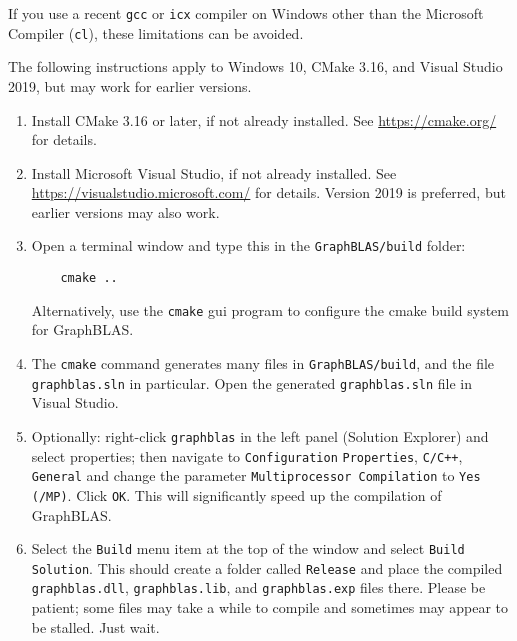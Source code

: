 \documentclass[12pt]{article}
\begin{document}
If you use a recent \verb'gcc' or \verb'icx' compiler on Windows other than the
Microsoft Compiler (\verb'cl'), these limitations can be avoided.

The following instructions apply to Windows 10, CMake 3.16, and
Visual Studio 2019, but may work for earlier versions.

\begin{enumerate}

\item Install CMake 3.16 or later, if not already installed.
    See \url{https://cmake.org/} for details.

\item Install Microsoft Visual Studio, if not already installed.
    See \url{https://visualstudio.microsoft.com/} for details.
    Version 2019 is preferred, but earlier versions may also work.

\item Open a terminal window and type this in the
    \verb'GraphBLAS/build' folder:

    \vspace{-0.1in}
    {\small
    \begin{verbatim}
    cmake ..  \end{verbatim} }
    \vspace{-0.1in}

    Alternatively, use the \verb'cmake' gui program to configure
    the cmake build system for GraphBLAS.

\item The \verb'cmake' command generates many files in
    \verb'GraphBLAS/build', and the file \verb'graphblas.sln' in
    particular.  Open the generated \verb'graphblas.sln' file in Visual Studio.

\item Optionally: right-click \verb'graphblas' in the left panel (Solution
    Explorer) and select properties; then navigate to \verb'Configuration'
    \verb'Properties', \verb'C/C++', \verb'General' and change the parameter
    \verb'Multiprocessor Compilation' to \verb'Yes (/MP)'.  Click \verb'OK'.
    This will significantly speed up the compilation of GraphBLAS.

\item Select the \verb'Build' menu item at the top of the window and
    select \verb'Build Solution'.  This should create a folder called
    \verb'Release' and place the compiled \verb'graphblas.dll',
    \verb'graphblas.lib', and \verb'graphblas.exp' files there.  Please be
    patient; some files may take a while to compile and sometimes may appear to
    be stalled.  Just wait.


\end{enumerate}
\end{document}
